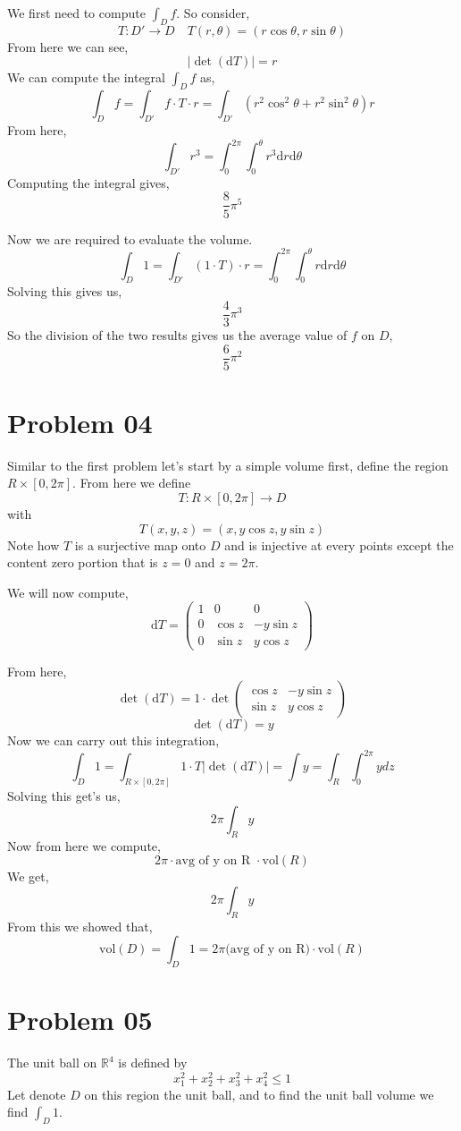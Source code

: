 \documentclass[letter]{article}
\begin{document}
We first need to compute $\int_D f$. So consider,
\[
T : D' \to  D \quad 
T(r, \theta) = (r \cos \theta, r \sin \theta)
\] From here we can see, 
\[
| \det (\mathrm{d} T) | = r
\]
We can compute the integral $\int_D f $ as, 
\[
	\int_D  f= \int_{D'} f \cdot T \cdot r  = 
	\int_{D'} (r^2 \cos ^2 \theta + r^2 \sin ^2 \theta) r 
\]
From here, 
\[
	\int_{D'} r^3  = \int_{0}^{2 \pi } \int_{0 }^{\theta} r^3 \mathrm{d} r \mathrm{d} \theta  
\]
Computing the integral gives, 
\[
\frac{8}{5} \pi^5
\]

Now we are required to evaluate the volume. 
\[
	\int_D 1 = \int_{D'} (1 \cdot T) \cdot r = 
	\int_{0}^{2 \pi } \int_{0}^{\theta} r \mathrm{d} r \mathrm{d} \theta 
\] 
Solving this gives us, 
\[
\frac{4}{3} \pi^3 
\] 
So the division of the two results gives us the average value of $f$ on $D$, 
\[
\frac{6}{5} \pi^2
\]

\section*{Problem 04} 
Similar to the first problem let's start by a simple volume first, define the region $R \times [0, 2 \pi]$. From here we define 
\[
	T : R \times [0, 2\pi ] \to D
\]
with 
\[
T(x,y,z) = 
(x , y \cos z, y \sin z)
\] 
Note how $T$ is a surjective map onto $D$ and is injective at every points except the content zero portion that is  $z = 0$ and $z = 2 \pi$. 

We will now compute, 
\[
\mathrm{d} T = 
\begin{pmatrix} 1 & 0 & 0 \\ 
0 & \cos z & - y \sin z \\ 
0 & \sin z & y \cos z \end{pmatrix} 
\]

From here, 
\[
\det (\mathrm{d} T) = 1 \cdot 
\det 
\begin{pmatrix}   \cos z & - y \sin z \\ \sin z & y \cos z  \end{pmatrix} 
\]
\[
\det (\mathrm{d} T) = y
\]
Now we can carry out this integration, 
\[
\int_D 1 = 
\int_{R \times [0, 2\pi ]} 1 \cdot T | \det (\mathrm{d} T) |  = 
\int y = \int_{R}^{} \int_{0 }^{ 2 \pi } y dz   
\]
Solving this get's us, 
\[
2 \pi \int_R y 
\]
Now from here we compute, 
\[
2 \pi \cdot \text{avg of y on R } \cdot \text{vol}(R)
\]
We get,
\[
2 \pi \int_R y
\] 
From this we showed that, 
\[
\text{vol} (D) = \int_D 1 = 2 \pi \text{(avg of y on R)} \cdot \text{vol}(R)
\]

\section{Problem 05} 
The unit ball on $\mathbb{R}^{4}$ is defined by 
 \[
x_1 ^2 + x_2 ^2 + x_3^2 + x_4^2 \le 1
\] 
Let denote $D$ on this region the unit ball, and to find the unit ball volume we find 
$\int_D 1 $. 
\end{document}

